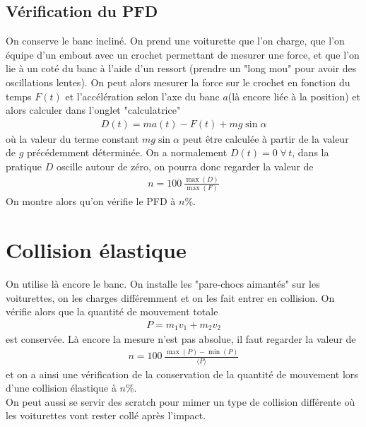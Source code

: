 \documentclass[12pt,prb,aps,epsf]{article}
\begin{document}
\subsection{Vérification du PFD}	
On conserve le banc incliné. On prend une voiturette que l'on charge, que l'on équipe d'un embout avec un crochet permettant de mesurer une force, et que l'on lie à un coté du banc à l'aide d'un ressort (prendre un "long mou" pour avoir des oscillations lentes). On peut alors mesurer la force sur le crochet en fonction du temps $F(t)$ et l'accélération selon l'axe du banc $a$(là encore liée à la position) et alors calculer dans l'onglet "calculatrice" 
\begin{eqnarray}
D(t) = ma(t) -F(t) + mg\sin\alpha
\end{eqnarray}
où la valeur du terme constant $mg\sin\alpha$ peut être calculée à partir de la valeur de $g$ précédemment déterminée. On a normalement $D(t) = 0\; \forall\, t$, dans la pratique $D$ oscille autour de zéro, on pourra donc regarder la valeur de 
\begin{eqnarray}
n =100\,\frac{\max(D)}{\max(F)}
\end{eqnarray}
On montre alors qu'on vérifie le PFD à $n$\%.
	
\section{Collision élastique}
On utilise là encore le banc. On installe les "pare-chocs aimantés" sur les voiturettes, on les charges différemment et on les fait entrer en collision. On vérifie alors que la quantité de mouvement totale 
\begin{eqnarray}
P = m_1v_1+m_2v_2
\end{eqnarray}
est conservée. Là encore la mesure n'est pas absolue, il faut regarder la valeur de
\begin{eqnarray}
n = 100\,\frac{\max(P) - \min(P)}{\langle P \rangle}
\end{eqnarray}	
et on a ainsi une vérification de la conservation de la quantité de mouvement lors d'une collision élastique à $n$\%.\\

On peut aussi se servir des scratch pour mimer un type de collision différente où les voiturettes vont rester collé après l'impact.
\end{document}
